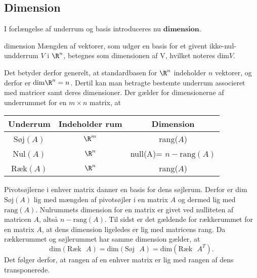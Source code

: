 \subsection{Dimension}
I forlængelse af underrum og basis introduceres nu
$\mathbf{dimension}$. 
%
\begin{defn}{}{dimension}
Mængden af vektorer, som udgør en basis for et givent ikke-nul-undderrum $V$ i $\R^n$, betegnes som dimensionen af V, hvilket noteres $\text{dim}V$. 
\end{defn}
\noindent
Det betyder derfor generelt, at standardbasen for $\R^n$ indeholder $n$ vektorer, og derfor er $\text{dim}\R^n = n$. Dertil kan man betragte bestemte underrum associeret med matricer samt deres dimensioner. Der gælder for dimensionerne af underrummet for en $m \times n$ matrix, at \\ 
\begin{center}
 \begin{tabular}{||c c c||} 
 \hline
 Underrum & Indeholder rum & Dimension\\
 \hline\hline
 Søj$(A)$ & $\R^m$ & rang($A$)\\ 
 \hline
 Nul$(A)$ & $\R^n$ & null(A)= $n-\text{rang}(A)$\\
 \hline
 Ræk$(A)$ & $\R^n$ & rang($A$)\\
 \hline
\end{tabular}
\end{center}
\noindent
Pivotsøjlerne i enhver matrix danner en basis for dens søjlerum. Derfor er dim$\text{Søj}(A)$ lig med mængden af pivotsøjler i en matrix $A$ og dermed lig med $\text{rang}(A)$. Nulrummets dimension for en matrix er givet ved nulliteten af matricen $A$, altså $n-\text{rang} (A)$. Til sidst er det gældende for rækkerummet for en matrix $A$, at dens dimension ligeledes er lig med matricens rang. Da rækkerummet og søjlerummet har samme dimension gælder, at\\
\begin{equation}
\text{dim}(\text{Ræk}\text{  } A)=\text{dim}(\text{Søj}\text{  } A)=\text{dim}(\text{Ræk}\text{  } A^T).
\end{equation}
Det følger derfor, at rangen af en enhver matrix er lig med rangen af dens transponerede. 

